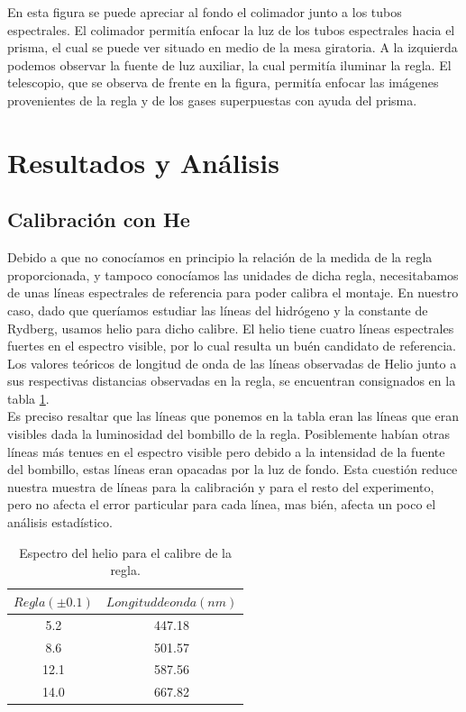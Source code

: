 \documentclass[%
 reprint,
 amsmath,amssymb,
 aps,
]{revtex4-1}
\begin{document}
En esta figura se puede apreciar al fondo el colimador junto a los tubos espectrales. El colimador permitía enfocar la luz de los tubos espectrales hacia el prisma, el cual se puede ver situado en medio de la mesa giratoria. A la izquierda podemos observar la fuente de luz auxiliar, la cual permitía iluminar la regla. El telescopio, que se observa de frente en la figura, permitía enfocar las imágenes provenientes de la regla y de los gases superpuestas con ayuda del prisma.\\

\section{\label{sec:level1}Resultados y An\'alisis}
\subsection{\label{sec:level2}Calibración con He}
Debido a que no conocíamos en principio la relación de la medida de la regla proporcionada, y tampoco conocíamos las unidades de dicha regla, necesitabamos de unas líneas espectrales de referencia para poder calibra el montaje. En nuestro caso, dado que queríamos estudiar las líneas del hidrógeno y la constante de Rydberg, usamos helio para dicho calibre. El helio tiene cuatro líneas espectrales fuertes en el espectro visible, por lo cual resulta un buén candidato de referencia. Los valores teóricos de longitud de onda de las líneas observadas de Helio junto a sus respectivas distancias observadas en la regla, se encuentran consignados en la tabla \ref{table:helio}.\\

Es preciso resaltar que las líneas que ponemos en la tabla eran las líneas que eran visibles dada la luminosidad del bombillo de la regla. Posiblemente habían otras líneas más tenues en el espectro visible pero debido a la intensidad de la fuente del bombillo, estas líneas eran opacadas por la luz de fondo. Esta cuestión reduce nuestra muestra de líneas para la calibración y para el resto del experimento, pero no afecta el error particular para cada línea, mas bién, afecta un poco el análisis estadístico. \\

\begin{table}[h!]
\centering
 \begin{tabular}{|c|c|} 
 \hline
 $Regla (\pm0.1)$ & $Longitud de onda (nm)$ \\ [0.5ex] 
 \hline\hline
5.2 &		447.18\\
8.6 &		501.57\\
12.1 &		587.56\\
14.0 &		667.82\\
[1ex] 
 \hline
 \end{tabular}
 \caption{Espectro del helio para el calibre de la regla.}
 \label{table:helio}
\end{table}
\end{document}

